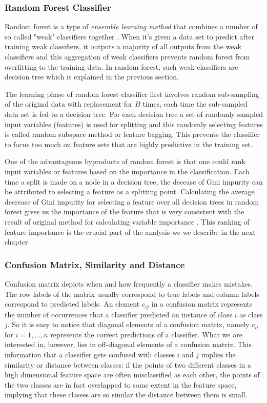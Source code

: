 \documentclass{article}
\begin{document}
	
		\subsubsection{Random Forest Classifier}
Random forest is a type of \textit{ensemble learning method} that combines a number of so called "weak" classifiers together \cite{RandomForest}. When it's given a data set to predict after training weak classifiers, it outputs a majority of all outputs from the weak classifiers and this aggregation of weak classifiers prevents random forest from overfitting to the training data. In random forest, such weak classifiers are decision tree which is explained in the previous section.

The learning phase of random forest classifier first involves random sub-sampling of the original data with replacement for $B$ times, each time the sub-sampled data set is fed to a decision tree. For each decision tree a set of randomly sampled input variables (features) is used for splitting and this randomly selecting features is called random subspace method or feature bagging. This prevents the classifier to focus too much on feature sets that are highly predictive in the training set. 

One of the advantageous byproducts of random forest is that one could rank input variables or features based on the importance in the classification. Each time a split is made on a node in a decision tree, the decease of Gini impurity can be attributed to selecting a feature as a splitting point.  Calculating the average decrease of Gini impurity for selecting a feature over all decision trees in random forest gives us the importance of the feature that is very consistent with the result of original method for calculating variable importance \cite{RandomForest,RandomForestOnline}. This ranking of feature importance is the crucial part of the analysis we we describe in the next chapter.


		\subsubsection{Confusion Matrix, Similarity and Distance}
	Confusion matrix depicts when and how frequently a classifier makes mistakes. The row labels of the matrix usually correspond to  true labels and column labels correspond to predicted labels. An element $c_{ij}$ in a confusion matrix represents the number of occurrences that a classifier predicted an instance of class $i$ as class $j$. So it is easy to notice that diagonal elements of a confusion matrix, namely $c_{ii}$ for $i = 1,...,n$ represents the correct predictions of a classifier. What we are interested in, however, lies in off-diagonal elements of a confusion matrix. This information that a classifier gets confused with classes $i$ and $j$ implies the similarity or distance between classes: if the points of two different classes in a high dimensional feature space are often misclassified as each other,  
the points of the two classes are in fact overlapped to some extent in the feature space, implying that these classes are so similar the distance between them is small.
\end{document}
